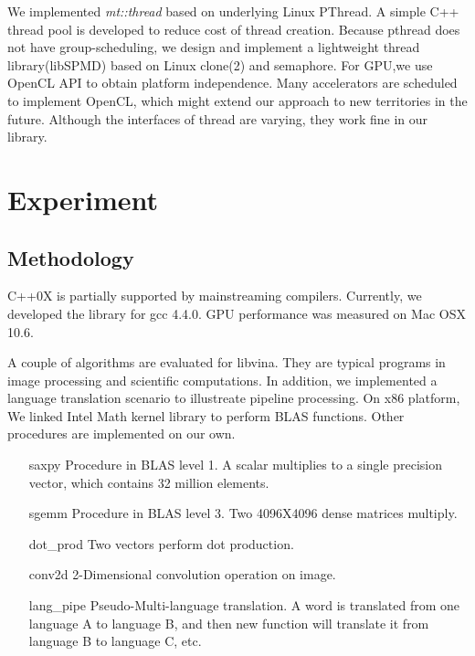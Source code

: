\documentclass[10pt, conference, compsocconf]{IEEEtran}
\begin{document}
We implemented \emph{mt::thread} based on underlying Linux PThread. A
simple C++ thread pool is developed to reduce cost of thread
creation. Because pthread does not have group-scheduling, we design
and implement a lightweight thread library(libSPMD) based on Linux
clone(2) and semaphore. For GPU,we use OpenCL API to obtain platform independence. Many accelerators are scheduled to
implement OpenCL, which might extend our approach to new
territories in the future.  Although the interfaces of thread are varying,
they work fine in our library.




\section{Experiment}
\subsection{Methodology}
C++0X is partially supported by mainstreaming compilers. Currently, we developed the library for gcc 4.4.0. GPU performance was measured on Mac OSX 10.6. 

A couple of algorithms are evaluated for libvina.  They are typical programs in image processing and scientific computations. In addition, we implemented a language translation scenario to illustreate pipeline processing. 
On x86 platform, We linked Intel Math kernel library to perform BLAS functions. Other procedures are implemented on our own. 

\begin{itemize}
\item[saxpy] Procedure in BLAS level 1. A scalar multiplies to a single precision vector, which contains 32 million elements.
\item[sgemm] Procedure in BLAS level 3. Two 4096X4096 dense matrices multiply.
\item[dot\_prod] Two vectors perform dot production.
\item[conv2d] 2-Dimensional convolution operation on image.
\item[lang\_pipe] Pseudo-Multi-language translation. A word is translated from one language A to language B, and then new function will translate it from language B to language C, etc.
\end{itemize}
\end{document}
